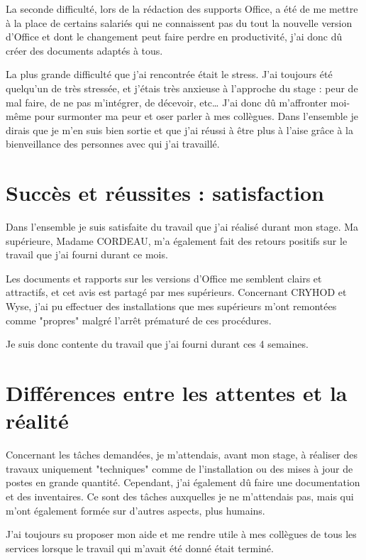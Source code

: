 La seconde difficulté, lors de la rédaction des supports Office, a été de me mettre à la place de certains salariés qui ne connaissent pas du tout la nouvelle version d’Office et dont le changement peut faire perdre en productivité, j’ai donc dû créer des documents adaptés à tous.

La plus grande difficulté que j’ai rencontrée était le stress. J’ai toujours été quelqu’un de très stressée, et j’étais très anxieuse à l’approche du stage : peur de mal faire, de ne pas m’intégrer, de décevoir, etc\dots
J’ai donc dû m’affronter moi-même pour surmonter ma peur et oser parler à mes collègues. Dans l’ensemble je dirais que je m’en suis bien sortie et que j’ai réussi à être plus à l’aise grâce à la bienveillance des personnes avec qui j’ai travaillé.


\section{Succès et réussites : satisfaction}

Dans l'ensemble je suis satisfaite du travail que j'ai réalisé durant mon stage. Ma supérieure, Madame CORDEAU, m'a également fait des retours positifs sur le travail que j'ai fourni durant ce mois.

Les documents et rapports sur les versions d'Office me semblent clairs et attractifs, et cet avis est partagé par mes supérieurs. Concernant CRYHOD et Wyse, j'ai pu effectuer des installations que mes supérieurs m'ont remontées comme "propres" malgré l'arrêt prématuré de ces procédures.

Je suis donc contente du travail que j'ai fourni durant ces 4 semaines.


\section{Différences entre les attentes et la réalité}

Concernant les tâches demandées, je m’attendais, avant mon stage, à réaliser des travaux uniquement "techniques" comme de l’installation ou des mises à jour de postes en grande quantité. Cependant, j’ai également dû faire une documentation et des inventaires. Ce sont des tâches auxquelles je ne m’attendais pas, mais qui m’ont également formée sur d’autres aspects, plus humains.

J’ai toujours su proposer mon aide et me rendre utile à mes collègues de tous les services lorsque le travail qui m’avait été donné était terminé.

